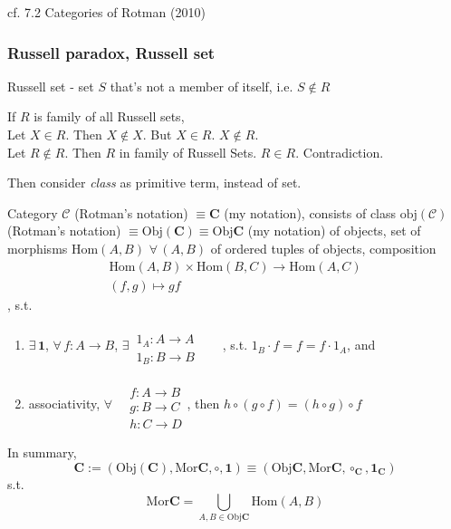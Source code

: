 cf. 7.2 Categories of Rotman (2010) \cite{agat:JRotman2010}

\subsubsection{Russell paradox, Russell set}  

\begin{definition}
Russell set  - set $S$ that's not a member of itself, i.e. $S\notin R$
\end{definition}

If $R$ is family of all Russell sets,  \\
Let $X\in R$.  Then $X\notin X$.  But $X\in R$.  $X\notin R$.  \\
Let $R\notin R$.  Then $R$ in family of Russell Sets.  $R\in R$.  Contradiction.  

Then consider \emph{class} as primitive term, instead of set.  

\begin{definition}[Category]
Category $\mathcal{C}$ (Rotman's notation) $\equiv \mathbf{C}$ (my notation), consists of class $\text{obj}(\mathcal{C})$ (Rotman's notation) $\equiv \text{Obj}(\mathbf{C}) \equiv \text{Obj}\mathbf{C}$ (my notation) of objects, set of  morphisms $\text{Hom}(A,B)$ $\forall \,  (A,B)$ of ordered tuples of objects, composition 
\[
\begin{gathered} 
	\text{Hom}(A,B)\times \text{Hom}(B ,C) \to \text{Hom}(A,C) \\
(f,g)\mapsto gf \end{gathered}
\], s.t.
\begin{enumerate}
\item $\exists \, \mathbf{1}$, $\forall \, f:A\to B$, $\exists \, \begin{aligned} & \quad \\ 
1_A : A \to A \\
1_B : B \to B \end{aligned}$, s.t. $1_B \cdot f = f= f\cdot 1_A$, and 
\item associativity, $\forall \, \begin{aligned} & \quad \\
& f : A\to B \\
& g: B\to C \\
& h: C\to D \end{aligned}$, then $h\circ (g\circ f) = (h\circ g) \circ f$ 
\end{enumerate}

In summary, 
\begin{equation}
	\mathbf{C} := (\text{Obj}(\mathbf{C}), \text{Mor}\mathbf{C}, \circ, \mathbf{1}) \equiv (\text{Obj}\mathbf{C}, \text{Mor}\mathbf{C}, \circ_{\mathbf{C}}, \mathbf{1}_{\mathbf{C}})
\end{equation}
s.t. 
\[
\text{Mor}\mathbf{C} = \bigcup_{A,B \in \text{Obj}\mathbf{C}} \text{Hom}(A,B)
\]
\end{definition}

